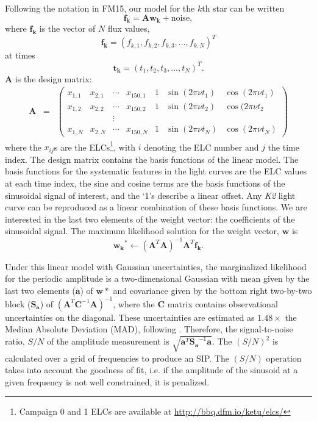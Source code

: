 \documentclass[useAMS, usenatbib, preprint, 12pt]{aastex}
\begin{document}
Following the notation in FM15, our model for the $k$th star can be written
\begin{equation}
	\mathbf{f_k} = \mathbf{A}\mathbf{w_k} + \mathrm{noise},
\end{equation}
where $\mathbf{f_k}$ is the vector of $N$ flux values,
\begin{equation}
	\mathbf{f_k} = (f_{k,1}, f_{k,2}, f_{k,3}, ..., f_{k,N})^T
\end{equation}
at times
\begin{equation}
	\mathbf{t_k} = (t_1, t_2, t_3, ..., t_N)^T.
\end{equation}
$\mathbf{A}$ is the design matrix:
\begin{eqnarray}
	\mathbf{A} &=& \left (\begin{array}{ccccccc}
	x_{1,1} & x_{2,1} & \cdots & x_{150,1} & 1 & \sin(2\pi\nu t_1) & \cos(2\pi\nu t_1) \\
	x_{1,2} & x_{2,2} & \cdots & x_{150,2} & 1 & \sin(2\pi\nu t_2) & \cos(2\pi\nu t_2\\
    && \vdots &&&\\
	x_{1,N} & x_{2,N} & \cdots & x_{150,N} & 1 & \sin(2\pi\nu t_N) & \cos(2\pi\nu t_N)
\end{array}\right )
\end{eqnarray}
where the $x_{ij}$s are the ELCs\footnote{Campaign 0 and 1 ELCs are
available at \url{http://bbq.dfm.io/ketu/elcs/}}, with $i$ denoting the ELC number
and $j$ the time index.
The design matrix contains the basis functions of the linear model.
The basis functions for the systematic features in the light curves are the ELC
values at each time index, the sine and cosine terms are the basis functions of
the sinusoidal signal of interest, and the `1's describe a linear offset.
Any {\it K2} light curve can be reproduced as a linear combination of these
basis functions.
We are interested in the last two elements of the weight vector: the
coefficients of the sinusoidal signal.
The maximum likelihood solution for the weight vector,
$\mathbf{w}$ is
\begin{equation}
	\mathbf{w_k}^* \gets (\mathbf{A}^T\mathbf{A})^{-1}\mathbf{A}^T\mathbf{f_k}.
\end{equation}

Under this linear model with Gaussian uncertainties, the marginalized
likelihood for the periodic amplitude is a two-dimensional Gaussian with mean
given by the last two elements ($\mathbf{a}$) of $\mathbf{w}*$ and covariance
given by the bottom right two-by-two block ($\mathbf{S_a}$) of
$(\mathbf{A}^T \mathbf{C}^{-1} \mathbf{A})^{-1}$, where the $\mathbf{C}$
matrix contains observational uncertainties on the diagonal.
These uncertainties are estimated as $1.48 \times$ the Median Absolute
Deviation (MAD), following \citet{Aigrain2015}.
Therefore, the signal-to-noise ratio, $S/N$ of the amplitude measurement is
$\sqrt{\mathbf{a}^T \mathbf{S_a}^{-1} \mathbf{a}}$.
The $(S/N)^2$ is calculated over a grid of frequencies to produce an
SIP.
The $(S/N)$ operation takes into account the goodness of fit, i.e. if the
amplitude of the sinusoid at a given frequency is not well constrained,
it is penalized.
\end{document}
